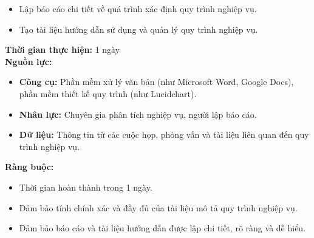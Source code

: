 {\begin{minipage}{\textwidth}
\begin{itemize}
        \item Lập báo cáo chi tiết về quá trình xác định quy trình nghiệp vụ.
        \item Tạo tài liệu hướng dẫn sử dụng và quản lý quy trình nghiệp vụ.
    \end{itemize}
    \vspace{0.5cm}
    \noindent \textbf{Thời gian thực hiện:} 1 ngày \\
    \noindent \textbf{Nguồn lực:}
    \begin{itemize}
        \item \textbf{Công cụ:} Phần mềm xử lý văn bản (như Microsoft Word, Google Docs), phần mềm thiết kế quy trình (như Lucidchart).
        \item \textbf{Nhân lực:} Chuyên gia phân tích nghiệp vụ, người lập báo cáo.
        \item \textbf{Dữ liệu:} Thông tin từ các cuộc họp, phỏng vấn và tài liệu liên quan đến quy trình nghiệp vụ.
    \end{itemize}
    \vspace{0.5cm}
    \noindent \textbf{Ràng buộc:}
    \begin{itemize}
        \item Thời gian hoàn thành trong 1 ngày.
        \item Đảm bảo tính chính xác và đầy đủ của tài liệu mô tả quy trình nghiệp vụ.
        \item Đảm bảo báo cáo và tài liệu hướng dẫn được lập chi tiết, rõ ràng và dễ hiểu.
    \end{itemize}
    \end{minipage}
}

\newpage %

% 
